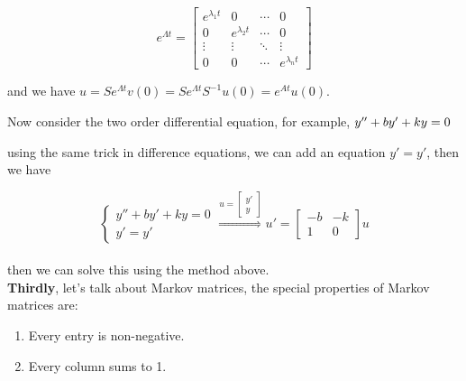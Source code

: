 \documentclass{article}
\begin{document}
\[ e^{\Lambda t} = \begin{bmatrix}
    e^{\lambda_1 t} & 0 & \cdots & 0 \\
    0 & e^{\lambda_2 t} & \cdots & 0 \\
    \vdots & \vdots & \ddots & \vdots \\
    0 & 0 & \cdots & e^{\lambda_n t}
\end{bmatrix} 
\]

and we have \( u = S e^{\Lambda t} v(0) = S e^{\Lambda t} S^{-1} u(0) = e^{At} u(0) \).

Now consider the two order differential equation, for example, 
\(
        y'' + by' + ky = 0  \\
\)

using the same trick in difference equations, we can add an equation \( y' = y' \), then we have

\[
    \begin{cases}
        y'' + by' + ky = 0  \\
        y' = y'
    \end{cases}
    \overset{u = \begin{bmatrix}
        y' \\
        y
    \end{bmatrix}}{\Longrightarrow}
    u' = \begin{bmatrix}
        -b & -k \\
        1 & 0
    \end{bmatrix}u
\]
\\

then we can solve this using the method above.
\\

\textbf{Thirdly}, let's talk about Markov matrices, the special properties of Markov matrices are:

\begin{enumerate}
    \item Every entry is non-negative.
    \item Every column sums to 1.
\end{enumerate}
\end{document}
